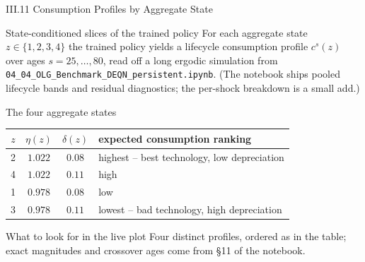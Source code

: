 \documentclass[aspectratio=169,11pt]{beamer}
\newcommand{\emphc}[1]{\textcolor{harvardcrimson}{#1}}
\begin{document}
\begin{frame}{III.11 Consumption Profiles by Aggregate State}
\footnotesize
\begin{block}{State-conditioned slices of the trained policy}
\vspace{-3pt}
For each aggregate state $z \in \{1,2,3,4\}$ the trained policy yields a lifecycle consumption profile $c^s(z)$ over ages $s=25,\ldots,80$, read off a long ergodic simulation from \texttt{04\_04\_OLG\_Benchmark\_DEQN\_persistent.ipynb}.  (The notebook ships pooled lifecycle bands and residual diagnostics; the per-shock breakdown is a small add.)
\end{block}

\begin{block}{The four aggregate states}
\vspace{-3pt}
\centering\renewcommand{\arraystretch}{0.95}
\begin{tabular}{cccl}
\toprule
$z$ & $\eta(z)$ & $\delta(z)$ & expected consumption ranking \\
\midrule
2 & $1.022$ & $0.08$ & \emphc{highest} -- best technology, low depreciation \\
4 & $1.022$ & $0.11$ & high \\
1 & $0.978$ & $0.08$ & low \\
3 & $0.978$ & $0.11$ & \emphc{lowest} -- bad technology, high depreciation \\
\bottomrule
\end{tabular}
\end{block}

\begin{alertblock}{What to look for in the live plot}
\vspace{-3pt}
Four distinct profiles, ordered as in the table; exact magnitudes and crossover ages come from \S 11 of the notebook.
\end{alertblock}
\end{frame}
\end{document}
